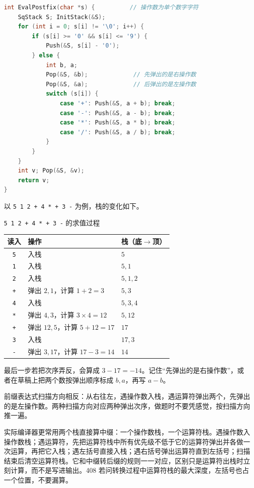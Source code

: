 \begin{lstlisting}[language=C]
int EvalPostfix(char *s) {          // 操作数为单个数字字符
    SqStack S; InitStack(&S);
    for (int i = 0; s[i] != '\0'; i++) {
        if (s[i] >= '0' && s[i] <= '9') {
            Push(&S, s[i] - '0');
        } else {
            int b, a;
            Pop(&S, &b);             // 先弹出的是右操作数
            Pop(&S, &a);             // 后弹出的是左操作数
            switch (s[i]) {
                case '+': Push(&S, a + b); break;
                case '-': Push(&S, a - b); break;
                case '*': Push(&S, a * b); break;
                case '/': Push(&S, a / b); break;
            }
        }
    }
    int v; Pop(&S, &v);
    return v;
}
\end{lstlisting}

以 \texttt{5 1 2 + 4 * + 3 -} 为例，栈的变化如下。

\begin{tablebox}{\texttt{5 1 2 + 4 * + 3 -} 的求值过程}
\centering\small
\begin{tabular}{@{}cll@{}}
\toprule
读入 & 操作 & 栈（底$\to$顶） \\
\midrule
\texttt{5} & 入栈 & $5$ \\
\texttt{1} & 入栈 & $5,1$ \\
\texttt{2} & 入栈 & $5,1,2$ \\
\texttt{+} & 弹出 $2,1$，计算 $1+2=3$ & $5,3$ \\
\texttt{4} & 入栈 & $5,3,4$ \\
\texttt{*} & 弹出 $4,3$，计算 $3\times4=12$ & $5,12$ \\
\texttt{+} & 弹出 $12,5$，计算 $5+12=17$ & $17$ \\
\texttt{3} & 入栈 & $17,3$ \\
\texttt{-} & 弹出 $3,17$，计算 $17-3=14$ & $14$ \\
\bottomrule
\end{tabular}
\end{tablebox}

\noindent 最后一步若把次序弄反，会算成 $3-17=-14$。记住“先弹出的是右操作数”，或者在草稿上把两个数按弹出顺序标成 $b,a$，再写 $a-b$。

前缀表达式扫描方向相反：从右往左，遇操作数入栈，遇运算符弹出两个，先弹出的是左操作数。两种扫描方向对应两种弹出次序，做题时不要凭感觉，按扫描方向推一遍。

实际编译器更常用两个栈直接算中缀：一个操作数栈，一个运算符栈。遇操作数入操作数栈；遇运算符，先把运算符栈中所有优先级不低于它的运算符弹出并各做一次运算，再把它入栈；遇左括号直接入栈；遇右括号弹出运算符直到左括号；扫描结束后清空运算符栈。它和中缀转后缀的规则一一对应，区别只是运算符出栈时立刻计算，而不是写进输出。408 若问转换过程中运算符栈的最大深度，左括号也占一个位置，不要漏算。


